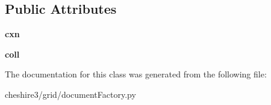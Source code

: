 \subsection*{Public Attributes}
\begin{DoxyCompactItemize}
\item 
\hypertarget{classcheshire3_1_1grid_1_1document_factory_1_1_irods_stream_aef6d6abcae4a9c9423af0f4e0b355157}{{\bfseries cxn}}\label{classcheshire3_1_1grid_1_1document_factory_1_1_irods_stream_aef6d6abcae4a9c9423af0f4e0b355157}

\item 
\hypertarget{classcheshire3_1_1grid_1_1document_factory_1_1_irods_stream_a1a0d73569fe637f3ac22c124a27fe1e9}{{\bfseries coll}}\label{classcheshire3_1_1grid_1_1document_factory_1_1_irods_stream_a1a0d73569fe637f3ac22c124a27fe1e9}

\end{DoxyCompactItemize}


The documentation for this class was generated from the following file\-:\begin{DoxyCompactItemize}
\item 
cheshire3/grid/document\-Factory.\-py\end{DoxyCompactItemize}
